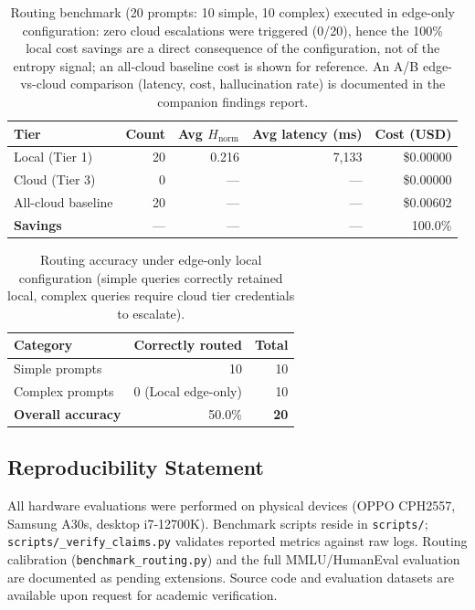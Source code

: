 \documentclass[11pt]{article}
\begin{document}
\begin{table}[h]
\centering
\caption{Routing benchmark (20 prompts: 10 simple, 10 complex) executed in
edge-only configuration: zero cloud escalations were triggered (0/20), hence
the 100\% local cost savings are a direct consequence of the configuration,
not of the entropy signal; an all-cloud baseline cost is shown for reference.
An A/B edge-vs-cloud comparison (latency, cost, hallucination rate) is
documented in the companion findings report.}
\label{tab:routing}
\begin{tabular}{lrrrr}
\toprule
Tier & Count & Avg $H_{\text{norm}}$ & Avg latency (ms) & Cost (USD) \\
\midrule
Local (Tier 1) & 20 & 0.216 & 7,133 & \$0.00000 \\
Cloud (Tier 3) & 0 & — & — & \$0.00000 \\
\midrule
All-cloud baseline & 20 & — & — & \$0.00602 \\
\textbf{Savings} & — & — & — & 100.0\% \\
\bottomrule
\end{tabular}
\end{table}


\begin{table}[h]
\centering
\caption{Routing accuracy under edge-only local configuration (simple queries correctly retained local, complex queries require cloud tier credentials to escalate).}
\label{tab:routing_acc}
\begin{tabular}{lrr}
\toprule
Category & Correctly routed & Total \\
\midrule
Simple prompts & 10 & 10 \\
Complex prompts & 0 (Local edge-only) & 10 \\
\textbf{Overall accuracy} & 50.0\% & \textbf{20} \\
\bottomrule
\end{tabular}
\end{table}

\subsection*{Reproducibility Statement}

All hardware evaluations were performed on physical devices (OPPO CPH2557,
Samsung A30s, desktop i7-12700K). Benchmark scripts reside in
\texttt{scripts/}; \texttt{scripts/\_verify\_claims.py} validates reported
metrics against raw logs. Routing calibration
(\texttt{benchmark\_routing.py}) and the full MMLU/HumanEval evaluation are
documented as pending extensions. Source code and evaluation datasets are
available upon request for academic verification.
\end{document}
